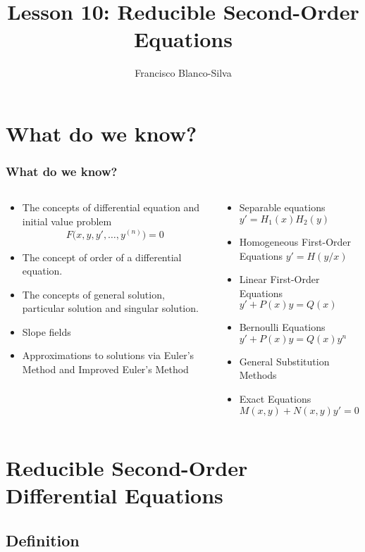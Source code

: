 \documentclass[10pt,xcolor=x11names,compress]{beamer}
\author[Francisco Blanco-Silva]{Francisco Blanco-Silva}
\institute[USC]{University of South Carolina}
\date{
\pgfdeclarelindenmayersystem{Sierpinski triangle}{
\rule{F -> G-F-G}
\rule{G -> F+G+F}}
	\begin{tikzpicture} 
    \shadedraw [top color=DeepSkyBlue4, bottom color=DeepSkyBlue4, draw=DeepSkyBlue4]
[l-system={Sierpinski triangle, step=1pt, angle=60, axiom=F, order=8}]
lindenmayer system -- cycle;
	\end{tikzpicture}
}
\title{Lesson 10: Reducible Second-Order Equations}
\begin{document}
\frame{\titlepage}

\section{What do we know?}
\begin{frame}\frametitle{What do we know?}
\begin{columns}[T]
\begin{column}{0.6\linewidth}
\begin{itemize}
\item The concepts of \alert{differential equation} and \alert{initial value problem}
\begin{equation*}
F\big(x,y,y',\dotsc,y^{(n)}\big)=0
\end{equation*}
\item The concept of \alert{order} of a differential equation.
\item The concepts of \alert{general solution}, \alert{particular solution} and \alert{singular solution}.
\item \alert{Slope fields}
\item Approximations to solutions via \alert{Euler's Method} and \alert{Improved Euler's Method}
\end{itemize} 
\end{column}
\begin{column}{0.4\linewidth}
\begin{itemize}
\item Separable equations $y'=H_1(x) H_2(y)$
\item Homogeneous First-Order Equations $y'=H(y/x)$
\item Linear First-Order Equations $y'+P(x)y=Q(x)$
\item Bernoulli Equations $y'+P(x)y=Q(x)y^n$
\item General Substitution Methods
\item Exact Equations $M(x,y)+N(x,y)y'=0$
\end{itemize}
\end{column}
\end{columns}
\end{frame}

\section{Reducible Second-Order Differential Equations}
\subsection{Definition}
\end{document}
